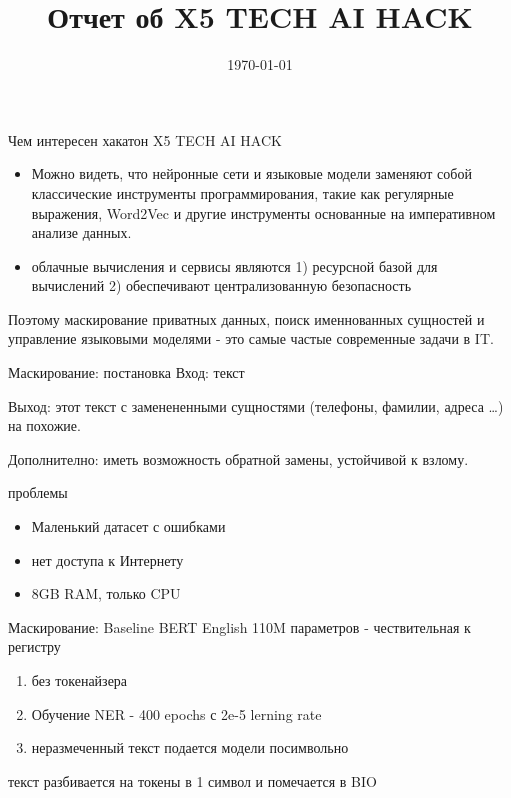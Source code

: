 \documentclass[presentation]{beamer}
\date{\today}
\title{Отчет об X5 TECH AI HACK}
\begin{document}
\maketitle


\begin{frame}[label={sec:orgf129232}]{Чем интересен хакатон X5 TECH AI HACK}
\begin{itemize}
\item Можно видеть, что нейронные сети и языковые модели заменяют собой
классические инструменты программирования, такие как регулярные
выражения, Word2Vec и другие инструменты основанные на императивном
анализе данных.
\item облачные вычисления и сервисы являются 1) ресурсной базой для
вычислений 2) обеспечивают централизованную безопасность
\end{itemize}

Поэтому маскирование приватных данных, поиск именнованных сущностей и
 управление языковыми моделями - это самые частые современные задачи в
 IT.
\end{frame}
\begin{frame}[label={sec:orgcc8a931}]{Маскирование: постановка}
Вход: текст

Выход: этот текст с заменененными сущностями (телефоны, фамилии,
 адреса \ldots{})  на похожие.

Дополнително: иметь возможность обратной замены, устойчивой к взлому.
\end{frame}
\begin{frame}[label={sec:org311c170}]{проблемы}
\begin{itemize}
\item Маленький датасет с ошибками
\item нет доступа к Интернету
\item 8GB RAM, только CPU
\end{itemize}
\end{frame}
\begin{frame}[label={sec:orgfa67bd8}]{Маскирование: Baseline}
BERT English 110M параметров - чествительная к регистру
\begin{enumerate}
\item без токенайзера
\item Обучение NER - 400 epochs с 2e-5 lerning rate
\item неразмеченный текст подается модели посимвольно
\end{enumerate}

текст разбивается на токены в 1 символ и помечается в BIO
\end{frame}
\end{document}
